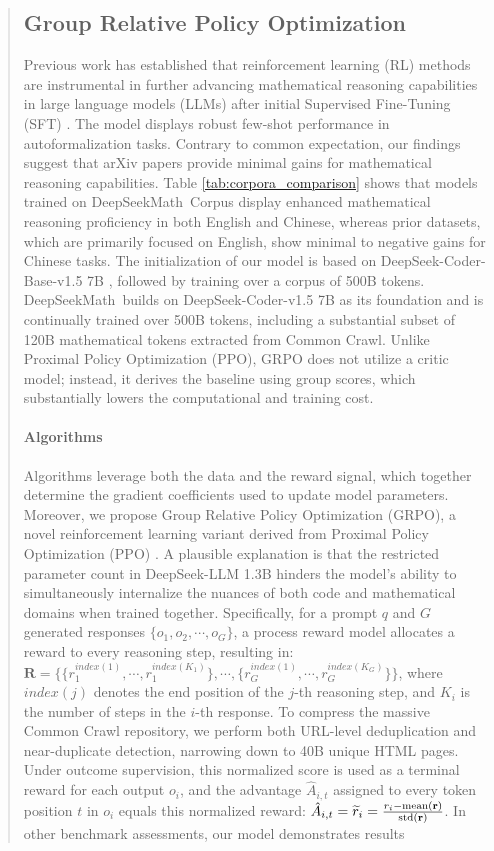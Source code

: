\begin{itemize}[topsep=0pt]
\begin{itemize}[topsep=0pt]
\begin{itemize}[topsep=0pt]
\begin{abstract}
\begin{itemize}[topsep=0pt]
\subsection{Group Relative Policy Optimization} Previous work has established that reinforcement learning (RL) methods are instrumental in further advancing mathematical reasoning capabilities in large language models (LLMs) after initial Supervised Fine-Tuning (SFT) \citep{wang2023math,wizardmath}. The model displays robust few-shot performance in autoformalization tasks. Contrary to common expectation, our findings suggest that arXiv papers provide minimal gains for mathematical reasoning capabilities. Table \ref{tab:corpora_comparison} shows that models trained on DeepSeekMath~Corpus display enhanced mathematical reasoning proficiency in both English and Chinese, whereas prior datasets, which are primarily focused on English, show minimal to negative gains for Chinese tasks. The initialization of our model is based on DeepSeek-Coder-Base-v1.5 7B \citep{deepseek-coder}, followed by training over a corpus of 500B tokens. DeepSeekMath~builds on DeepSeek-Coder-v1.5 7B as its foundation and is continually trained over 500B tokens, including a substantial subset of 120B mathematical tokens extracted from Common Crawl. Unlike Proximal Policy Optimization (PPO), GRPO does not utilize a critic model; instead, it derives the baseline using group scores, which substantially lowers the computational and training cost. \paragraph{Algorithms} Algorithms leverage both the data and the reward signal, which together determine the gradient coefficients used to update model parameters. Moreover, we propose Group Relative Policy Optimization (GRPO), a novel reinforcement learning variant derived from Proximal Policy Optimization (PPO) \citep{schulman2017proximal}. A plausible explanation is that the restricted parameter count in DeepSeek-LLM 1.3B hinders the model’s ability to simultaneously internalize the nuances of both code and mathematical domains when trained together. Specifically, for a prompt $q$ and $G$ generated responses $\{o_1, o_2, \cdots, o_G\}$, a process reward model allocates a reward to every reasoning step, resulting in: $\mathbf{R} = \{ \{r_1^{index(1)},\cdots,r_1^{index(K_1)}\}, \cdots,  \{r_G^{index(1)},\cdots,r_G^{index(K_G)}\} \}$, where $index(j)$ denotes the end position of the $j$-th reasoning step, and $K_i$ is the number of steps in the $i$-th response. To compress the massive Common Crawl repository, we perform both URL-level deduplication and near-duplicate detection, narrowing down to 40B unique HTML pages. Under outcome supervision, this normalized score is used as a terminal reward for each output $o_i$, and the advantage $\hat{A}_{i, t}$ assigned to every token position $t$ in $o_i$ equals this normalized reward: $\hat{A}_{i, t} = \widetilde{r}_i = \frac{r_i- {\rm mean}(\mathbf{r})}{{\rm std}(\mathbf{r})}$. In other benchmark assessments, our model demonstrates results 
\end{itemize}
\end{abstract}
\end{itemize}
\end{itemize}
\end{itemize}
